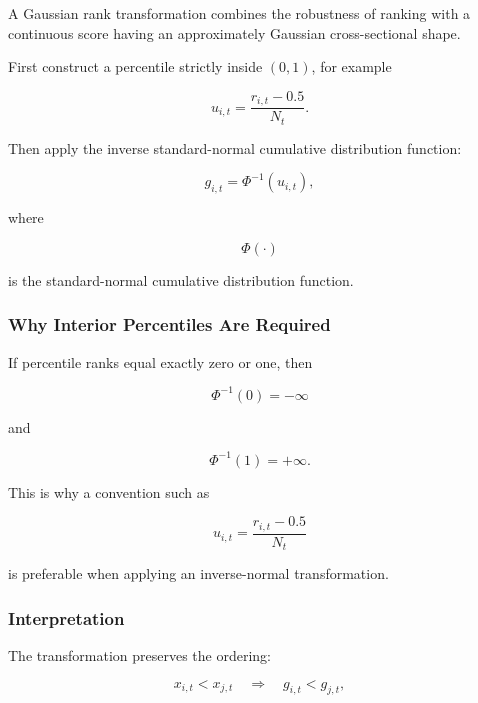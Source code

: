 \documentclass[11pt,a4paper]{article}
\begin{document}
A Gaussian rank transformation combines the robustness of ranking with a
continuous score having an approximately Gaussian cross-sectional shape.

First construct a percentile strictly inside $(0,1)$, for example

\begin{equation}
u_{i,t}
=
\frac{
r_{i,t}-0.5
}{
N_t
}.
\end{equation}

Then apply the inverse standard-normal cumulative distribution function:

\begin{equation}
\boxed{
g_{i,t}
=
\Phi^{-1}
\left(
u_{i,t}
\right),
}
\end{equation}

where

\begin{equation}
\Phi(\cdot)
\end{equation}

is the standard-normal cumulative distribution function.


\subsubsection{Why Interior Percentiles Are Required}

If percentile ranks equal exactly zero or one, then

\begin{equation}
\Phi^{-1}(0)
=
-\infty
\end{equation}

and

\begin{equation}
\Phi^{-1}(1)
=
+\infty.
\end{equation}

This is why a convention such as

\begin{equation}
u_{i,t}
=
\frac{r_{i,t}-0.5}{N_t}
\end{equation}

is preferable when applying an inverse-normal transformation.


\subsubsection{Interpretation}

The transformation preserves the ordering:

\begin{equation}
x_{i,t}<x_{j,t}
\quad\Rightarrow\quad
g_{i,t}<g_{j,t},
\end{equation}
\end{document}
